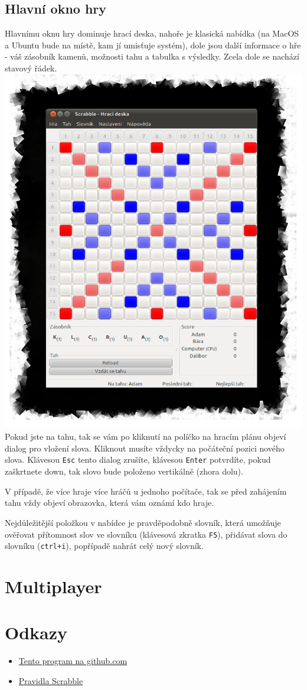 \documentclass[a4paper]{article}
\begin{document}
\subsection{Hlavní okno hry}
Hlavnímu oknu hry dominuje hrací deska, nahoře je klasická nabídka (na MacOS a Ubuntu bude na místě, kam jí umisťuje systém), dole jsou další informace o hře - váš zásobník kamenů, možnosti tahu a tabulka s výsledky. Zcela dole se nachází stavový řádek.
\includegraphics[scale=1]{mainWindow.png}
Pokud jste na tahu, tak se vám po kliknutí na políčko na hracím plánu objeví dialog pro vložení slova. Kliknout musíte vždycky na počáteční pozici nového slova. Klávesou \texttt{Esc} tento dialog zrušíte, klávesou \texttt{Enter} potvrdíte, pokud zaškrtnete down, tak slovo bude položeno vertikálně (zhora dolu).

V případě, že více hraje více hráčů u jednoho počítače, tak se před zahájením tahu vždy objeví obrazovka, která vám oznámí kdo hraje.

Nejdůležitější položkou v nabídce je pravděpodobně slovník, která umožňuje ověřovat přítomnost slov ve slovníku (klávesová zkratka \texttt{F5}), přidávat slova do slovníku (\texttt{ctrl+i}), popřípadě nahrát celý nový slovník.
\section{Multiplayer}
\section{Odkazy}
\begin{itemize}
\item \href{http://github.com/Kedrigern/scrabble}{Tento program na github.com}
\item \href{http://scrabble.hrejsi.cz/pravidla/}{Pravidla Scrabble}
\end{itemize}
\end{document}
